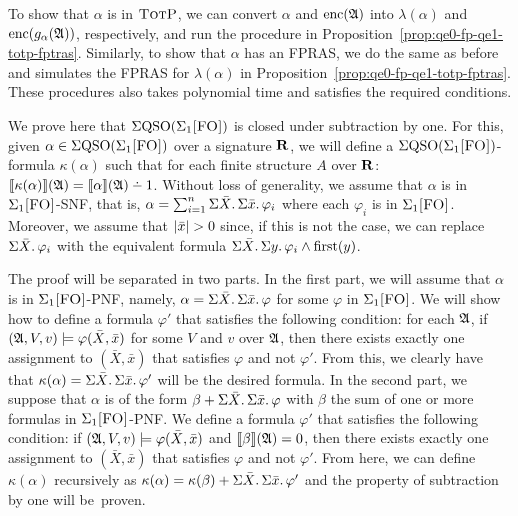 To show that $\alpha$ is in $\text{\sc TotP}$, we can convert $\alpha$ and ${\rm enc}(\mathfrak{A})$ into $\lambda(\alpha)$ and ${\rm enc}(g_{\alpha}(\mathfrak{A}))$, respectively, and run the procedure in Proposition~\ref{prop:qe0-fp-qe1-totp-fptras}. Similarly, to show that $\alpha$ has an FPRAS, we do the same as before and simulates the FPRAS for $\lambda(\alpha)$ in Proposition~\ref{prop:qe0-fp-qe1-totp-fptras}. These procedures also takes polynomial time and satisfies the required conditions.

\medskip


 We prove here that $\Sigma{\rm QSO}(\Sigma_{1}\textsc{[FO]})$ is closed under subtraction by one. 
For this, given $\alpha \in \Sigma{\rm QSO}(\Sigma_{1}\textsc{[FO]})$ over a signature $\mathbf{R}$, we will define a $\Sigma{\rm QSO}(\Sigma_{1}\textsc{[FO]})$-formula $\kappa(\alpha)$ such that for each finite structure $A$ over $\mathbf{R}$: $\sem{\kappa(\alpha)}(\A) = \sem{\alpha}(\A) \dotminus 1$. 
Without loss of generality, we assume that $\alpha$ is in $\Sigma_{1}\textsc{[FO]}$-SNF, that is, $\alpha = \sum_{i = 1}^{n}\Sigma{\bar{X}}.\,\Sigma{\bar{x}}.\,\varphi_i$ where each $\varphi_i$ is in $\Sigma_{1}\textsc{[FO]}$. Moreover, we assume that $\vert \bar{x} \vert > 0$  since, if this is not the case, we can replace $\Sigma{\bar{X}}.\,\varphi_i$ with the equivalent formula $\Sigma{\bar{X}}.\, \Sigma{y}.\, \varphi_i \wedge\operatorname{first}(y)$.

The proof will be separated in two parts. In the first part, we will assume that  $\alpha$ is in $\Sigma_{1}\textsc{[FO]}$-PNF, namely, $\alpha = \Sigma{\bar{X}}.\,\Sigma{\bar{x}}.\,\varphi$ for some $\varphi$ in $\Sigma_{1}\textsc{[FO]}$. We will show how to define a formula $\varphi'$ that satisfies the following condition: for each $\mathfrak{A}$, if $(\mathfrak{A},V,v)\models \varphi(\bar{X},\bar{x})$ for some $V$ and $v$ over $\mathfrak{A}$, then there exists exactly one assignment to $(\bar{X},\bar{x})$ that satisfies $\varphi$ and not $\varphi'$. 
From this, we clearly have that $\kappa(\alpha) = \Sigma{\bar{X}}.\,\Sigma{\bar{x}}.\,\varphi'$ will be the desired formula. In the second part, we suppose that $\alpha$ is of the form $\beta + \Sigma{\bar{X}}.\,\Sigma{\bar{x}}.\,\varphi$ with $\beta$ the sum of one or more formulas in $\Sigma_{1}\textsc{[FO]}$-PNF. 
We define a formula $\varphi'$ that satisfies the following condition: if $(\mathfrak{A},V,v)\models \varphi(\bar{X},\bar{x})$ and ${\llbracket{}{\beta}\rrbracket}(\mathfrak{A}) = 0$, then there exists exactly one assignment to $(\bar{X},\bar{x})$ that satisfies $\varphi$ and not $\varphi'$. From here, we can define $\kappa(\alpha)$ recursively as  $\kappa(\alpha) = \kappa(\beta) +  \Sigma{\bar{X}}.\,\Sigma{\bar{x}}.\,\varphi'$ and the property of subtraction by one will be~proven.

\medskip

